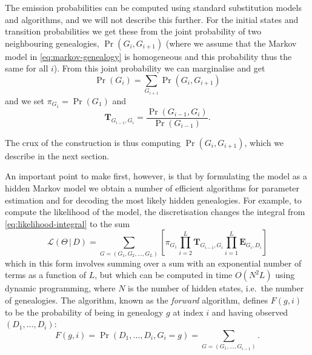 \documentclass[graybox]{svmult}
\newcommand{\G}{\ensuremath{G}}
\renewcommand{\D}{\ensuremath{D}}
\renewcommand{\lhd}{\ensuremath{\mathcal{L}}}
\newcommand{\T}{\ensuremath{\mathbf{T}}}
\renewcommand{\E}{\ensuremath{\mathbf{E}}}
\begin{document}
The emission probabilities can be computed using standard substitution models and algorithms, and we will not describe this further. For the initial states and transition probabilities we get these from the joint probability of two neighbouring genealogies, $\Pr(\G_i,\G_{i+1})$ (where we assume that the Markov model in \eqref{eq:markov-genealogy} is homogeneous and this probability thus the same for all $i$). From this joint probability we can marginalise and get
\begin{equation}
  \Pr(\G_i) = \sum_{\G_{i+1}} \Pr(\G_i,\G_{i+1})
\end{equation}
and we set $\pi_{\G_1}=\Pr(\G_1)$ and 
\begin{equation}
  \T_{\G_{i-1},\G_i} = \frac{\Pr(\G_{i-1},\G_i)}{\Pr(\G_{i-1})}.
\end{equation}

The crux of the construction is thus computing $\Pr(\G_i,\G_{i+1})$, which we describe in the next section.

An important point to make first, however, is that by formulating the model as a hidden Markov model we obtain a number of efficient algorithms for parameter estimation and for decoding the most likely hidden genealogies. For example, to compute the likelihood of the model, the discretisation changes the integral from \eqref{eq:likelihood-integral} to the sum
\begin{equation}
  \label{eq:likelhood-sum}
  \lhd(\Theta\,|\,\D) = 
  \sum_{\G=(\G_1,\G_2,\ldots,\G_L)} 
  	\left[
   	  \pi_{\G_1}
  	  \prod_{i=2}^{L}\T_{\G_{i-1},\G_{i}}
  	  \prod_{i=1}^L  \E_{\G_i,\D_i}
  	\right]
\end{equation}
which in this form involves summing over a sum with an exponential number of terms as a function of $L$, but which can be computed in time $O(N^2L)$ using dynamic programming, where $N$ is the number of hidden states, i.e.\ the number of genealogies. The algorithm, known as the \emph{forward} algorithm, defines $F(g,i)$ to be the probability of being in genealogy $g$ at index $i$ and having observed $(\D_1,\ldots,\D_i)$:
\begin{equation}
  F(g,i) = \Pr(\D_1,\ldots,\D_i,\G_i=g)
  = \sum_{\G=(\G_1,\ldots,\G_{i-1})} 
  .
\end{equation}
\end{document}
